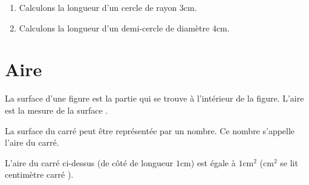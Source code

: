 \documentclass[a4paper,10pt]{report}
\begin{document}
\begin{ex}
\begin{enumerate}
\item Calculons la longueur d'un cercle de rayon $3$cm.

\noindent\grandscarreaux{\linewidth}{3.2cm}
\item Calculons la longueur d'un demi-cercle de diamètre $4$cm.

\noindent\grandscarreaux{\linewidth}{3.2cm}
\end{enumerate} 
\end{ex}

\section{Aire}

\begin{defn}
La surface d'une figure est la partie qui se trouve à l'intérieur de la figure.
\noindent L'aire est la mesure de la surface .
\end{defn}

\medskip
\noindent La surface du carré peut être représentée par un nombre. Ce nombre s'appelle l'aire du carré.

\begin{minipage}{3cm}
\begin{center}
\end{center}
\end{minipage}
\hspace{5mm}
\begin{minipage}{12cm}
L'aire du carré ci-dessus (de côté de longueur $1$cm) est égale à $1$cm$^2$ (cm$^2$ se lit  \og centimètre carré \fg{}).
\end{minipage}
\end{document}
